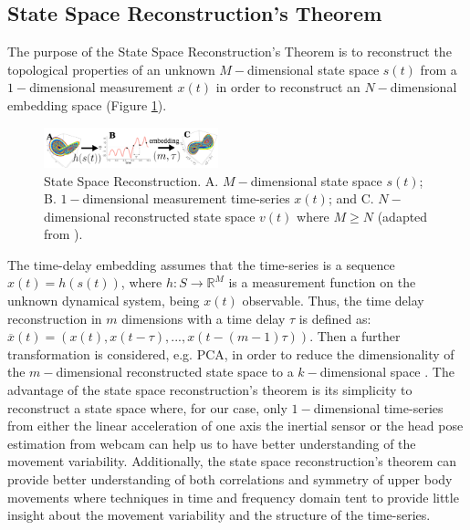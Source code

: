 \documentclass{sigchi}
\begin{document}
\subsection{State Space Reconstruction's Theorem}
The purpose of the State Space Reconstruction's Theorem is to reconstruct the
topological properties of an unknown $M-$dimensional state space $s(t)$ from a
$1-$dimensional measurement $x(t)$ in order to reconstruct an $N-$dimensional
embedding space
(Figure \ref{fig:takens_theorem}).
\begin{figure}
\centering
\includegraphics[width=0.45\textwidth]{figures/reconstructed_state_space/fig_v01}
\caption[PA]{State Space Reconstruction. A. $M-$dimensional state space $s(t)$;
B. $1-$dimensional measurement time-series $x(t)$; and
C. $N-$dimensional reconstructed state space $v(t)$
where $M \geq N$ (adapted from \cite{QuintanaDuque2012}).}
\label{fig:takens_theorem}
\end{figure}
The time-delay embedding assumes that the time-series is a sequence $x(t)=h(s(t))$,
where $h: S \rightarrow \mathbb{R}^M$ is a measurement function on the unknown
dynamical system, being $x(t)$ observable.
Thus, the time delay reconstruction in $m$ dimensions with a time delay
$\tau$ is defined as: $\overline{x}(t) = (x(t), x(t-\tau),...,x(t-(m-1)\tau))$.
Then a further transformation is considered, e.g. PCA, in order to reduce
the dimensionality of the $m-$dimensional reconstructed state space
to a $k-$dimensional space \cite{Uzal2011}.
The advantage of the state space reconstruction's theorem is its
simplicity to reconstruct a state space where, for our case, only $1-$dimensional time-series
from either the linear acceleration of one axis the inertial sensor or the head
pose estimation from webcam can help us to have better understanding of the movement
variability. Additionally, the state space reconstruction's theorem can provide better
understanding of both correlations and symmetry of upper body movements where
techniques in time and frequency domain tent to provide little insight about the
movement variability and the structure of the time-series.
\end{document}
